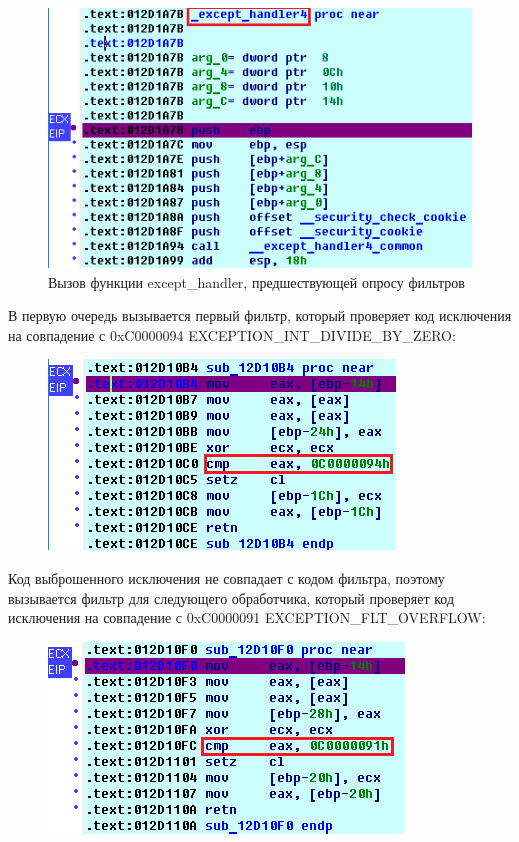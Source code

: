 \documentclass[14pt,a4paper,report]{report}
\begin{document}
\begin{figure}[h!]
	\centering
	\includegraphics[scale = 0.75]{images/6_d3.png}
	\caption{Вызов функции except\_handler, предшествующей опросу фильтров}
\end{figure}

В первую очередь вызывается первый фильтр, который проверяет код исключения на совпадение с 0xC0000094 EXCEPTION\_INT\_DIVIDE\_BY\_ZERO:

\begin{figure}[h!]
	\centering
	\includegraphics[scale = 0.95]{images/6_d4.png}
	\caption{}
\end{figure}

Код выброшенного исключения не совпадает с кодом фильтра, поэтому вызывается фильтр для следующего обработчика, который проверяет код исключения на совпадение с 0xC0000091 EXCEPTION\_FLT\_OVERFLOW:

\begin{figure}[h!]
	\centering
	\includegraphics[scale = 0.75]{images/6_d5.png}
	\caption{}
\end{figure}
\end{document}
